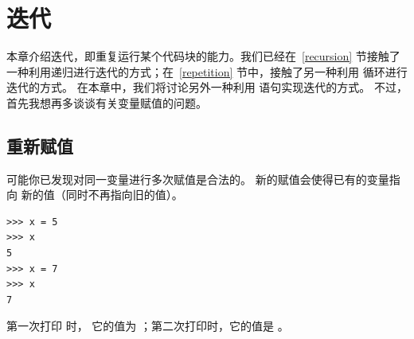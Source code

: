 

\chapter{迭代}


本章介绍迭代，即重复运行某个代码块的能力。我们已经在~\ref{recursion} 节接触了一种利用递归进行迭代的方式；在~\ref{repetition} 节中，接触了另一种利用  循环进行迭代的方式。 在本章中，我们将讨论另外一种利用  语句实现迭代的方式。
不过，首先我想再多谈谈有关变量赋值的问题。

\section{重新赋值}
    
    


可能你已发现对同一变量进行多次赋值是合法的。 新的赋值会使得已有的变量指向
新的值（同时不再指向旧的值）。

\begin{lstlisting}
>>> x = 5
>>> x
5
>>> x = 7
>>> x
7
\end{lstlisting}

%

第一次打印  时， 它的值为 ；第二次打印时，它的值是 。

